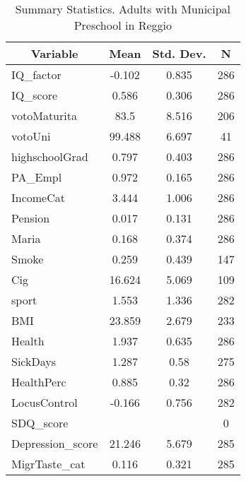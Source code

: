 
\begin{table}[htbp]\centering \caption{Summary Statistics. Adults with Municipal Preschool in Reggio \label{bothAdultmaternaMuniReggio}}
\begin{tabular}{l c c  c}\hline\hline
\multicolumn{1}{c}{\textbf{Variable}} & \textbf{Mean}
 & \textbf{Std. Dev.} & \textbf{N}\\ \hline
IQ\_factor & -0.102 & 0.835  & 286\\
IQ\_score & 0.586 & 0.306  & 286\\
votoMaturita & 83.5 & 8.516  & 206\\
votoUni & 99.488 & 6.697  & 41\\
highschoolGrad & 0.797 & 0.403  & 286\\
PA\_Empl & 0.972 & 0.165  & 286\\
IncomeCat & 3.444 & 1.006  & 286\\
Pension & 0.017 & 0.131  & 286\\
Maria & 0.168 & 0.374  & 286\\
Smoke & 0.259 & 0.439  & 147\\
Cig & 16.624 & 5.069  & 109\\
sport & 1.553 & 1.336  & 282\\
BMI & 23.859 & 2.679  & 233\\
Health & 1.937 & 0.635  & 286\\
SickDays & 1.287 & 0.58  & 275\\
HealthPerc & 0.885 & 0.32  & 286\\
LocusControl & -0.166 & 0.756  & 282\\
SDQ\_score &  &   & 0\\
Depression\_score & 21.246 & 5.679  & 285\\
MigrTaste\_cat & 0.116 & 0.321  & 285\\
\hline\end{tabular}
\end{table}
